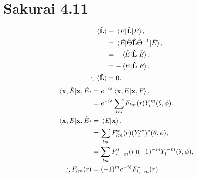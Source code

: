\documentclass[
a4paper,
10pt,
twoside,
]{article}
\begin{document}
\section{Sakurai 4.11}
\begin{align}
	\ev*{\vu{L}} &= \ev*{\vu{L}}{E},\\
	&= \ev*{\hat{\Theta}\vu{L}\hat{\Theta}^{-1}}{\tilde{E}},\\
	&= -\ev*{\vu{L}}{\tilde{E}},\\
	&= -\ev*{\vu{L}}{E}.\\
	\therefore \ev*{\vu{L}} &= 0.
\end{align}
\begin{align}
	\ip*{\vb{x},\tilde{E}} &= e^{-i\delta}\ip*{\vb{x},E},\\
	&= e^{-i\delta} \sum_{lm} F_{lm}(r)Y_l^m(\theta,\phi).\\
	\ip*{\vb{x},\tilde{E}} &= \ip*{E}{\vb{x}},\\
	&= \sum_{lm} F_{lm}^*(r)(Y_l^m)^*(\theta,\phi),\\
	&= \sum_{lm} F_{l,-m}^*(r)(-1)^{-m}Y_l^{-m}(\theta,\phi),\\
	\therefore F_{lm}(r) &= (-1)^m e^{-i\delta} F_{l,-m}^*(r).
\end{align}
\stopmcols
\end{document}
